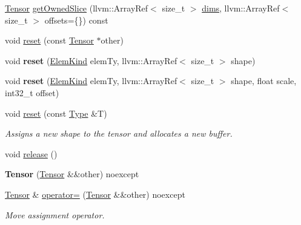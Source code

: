 \begin{DoxyCompactItemize}
\item 
\hyperlink{classglow_1_1_tensor}{Tensor} \hyperlink{classglow_1_1_tensor_aa2559af82f20a58b5e9da6d136a0684e}{get\+Owned\+Slice} (llvm\+::\+Array\+Ref$<$ size\+\_\+t $>$ \hyperlink{classglow_1_1_tensor_ad299b107d8ed92bb55392c4cb97070d9}{dims}, llvm\+::\+Array\+Ref$<$ size\+\_\+t $>$ offsets=\{\}) const
\item 
void \hyperlink{classglow_1_1_tensor_aac6a485f0e461c1be799b7b8ad3b985e}{reset} (const \hyperlink{classglow_1_1_tensor}{Tensor} $\ast$other)
\item 
\mbox{\label{classglow_1_1_tensor_a746f2e49d32b9630d283c2938eaac48b}} 
void {\bfseries reset} (\hyperlink{namespaceglow_ab92e14a94329daf4083db670e95fbcdf}{Elem\+Kind} elem\+Ty, llvm\+::\+Array\+Ref$<$ size\+\_\+t $>$ shape)
\item 
\mbox{\label{classglow_1_1_tensor_a138bbf066e0c7d1d635395fbd6d3d95e}} 
void {\bfseries reset} (\hyperlink{namespaceglow_ab92e14a94329daf4083db670e95fbcdf}{Elem\+Kind} elem\+Ty, llvm\+::\+Array\+Ref$<$ size\+\_\+t $>$ shape, float scale, int32\+\_\+t offset)
\item 
\mbox{\label{classglow_1_1_tensor_abe39403f76673198519ef4cd764a6ea1}} 
void \hyperlink{classglow_1_1_tensor_abe39403f76673198519ef4cd764a6ea1}{reset} (const \hyperlink{structglow_1_1_type}{Type} \&T)
\begin{DoxyCompactList}\small\item\em Assigns a new shape to the tensor and allocates a new buffer. \end{DoxyCompactList}\item 
void \hyperlink{classglow_1_1_tensor_a683bda6d887705f654f3dab72cd384a8}{release} ()
\item 
\mbox{\label{classglow_1_1_tensor_a36ed951b58cca4db640fffb4bc0eec3e}} 
{\bfseries Tensor} (\hyperlink{classglow_1_1_tensor}{Tensor} \&\&other) noexcept
\item 
\mbox{\label{classglow_1_1_tensor_a527a98b0a543ec2bef35c7986ed22376}} 
\hyperlink{classglow_1_1_tensor}{Tensor} \& \hyperlink{classglow_1_1_tensor_a527a98b0a543ec2bef35c7986ed22376}{operator=} (\hyperlink{classglow_1_1_tensor}{Tensor} \&\&other) noexcept
\begin{DoxyCompactList}\small\item\em Move assignment operator. \end{DoxyCompactList}\item 

\end{DoxyCompactItemize}
